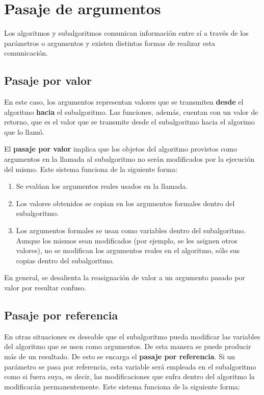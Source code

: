 \documentclass[]{book}
\providecommand{\tightlist}{%
  \setlength{\itemsep}{0pt}\setlength{\parskip}{0pt}}
\begin{document}
\section{Pasaje de argumentos}\label{pasaje-de-argumentos}

Los algoritmos y subalgoritmos comunican información entre sí a través
de los parámetros o argumentos y existen distintas formas de realizar
esta comunicación.

\subsection{Pasaje por valor}\label{pasaje-por-valor}

En este caso, los argumentos representan valores que se transmiten
\textbf{desde} el algoritmo \textbf{hacia} el subalgoritmo. Las
funciones, además, cuentan con un valor de retorno, que es el valor que
se transmite desde el subalgoritmo hacia el algorimo que lo llamó.

El \textbf{pasaje por valor} implica que los objetos del algoritmo
provistos como argumentos en la llamada al subalgoritmo no serán
modificados por la ejecución del mismo. Este sistema funciona de la
siguiente forma:

\begin{enumerate}
\def\labelenumi{\arabic{enumi}.}
\tightlist
\item
  Se evalúan los argumentos reales usados en la llamada.
\item
  Los valores obtenidos se copian en los argumentos formales dentro del
  subalgoritmo.
\item
  Los argumentos formales se usan como variables dentro del
  subalgoritmo. Aunque los mismos sean modificados (por ejemplo, se les
  asignen otros valores), no se modifican los argumentos reales en el
  algoritmo, sólo sus copias dentro del subalgoritmo.
\end{enumerate}

En general, se desalienta la reasignación de valor a un argumento pasado
por valor por resultar confuso.

\subsection{Pasaje por referencia}\label{pasaje-por-referencia}

En otras situaciones es deseable que el subalgoritmo pueda modificar las
variables del algoritmo que se usen como argumentos. De esta manera se
puede producir más de un resultado. De esto se encarga el \textbf{pasaje
por referencia}. Si un parámetro se pasa por referencia, esta variable
será empleada en el subalgoritmo como si fuera suya, es decir, las
modificaciones que sufra dentro del algoritmo la modificarán
permanentemente. Este sistema funciona de la siguiente forma:
\end{document}
